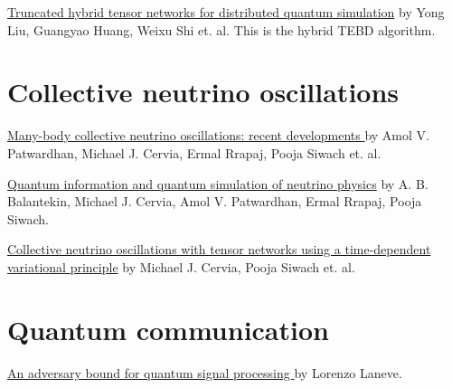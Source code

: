 \documentclass{article}
\newcommand{\vs}[1][1]{         %
    \vspace{#1em}
}
\begin{document}
\vs 

\href{https://arxiv.org/abs/2609.16520}{Truncated hybrid tensor networks for distributed quantum simulation} by Yong Liu, Guangyao Huang, Weixu Shi et. al. This is the hybrid TEBD algorithm.

\section{Collective neutrino oscillations}
\href{https://arxiv.org/abs/2301.00342}{Many-body collective neutrino oscillations: recent developments
} by Amol V. Patwardhan, Michael J. Cervia, Ermal Rrapaj, Pooja Siwach et. al.

\vs

\href{https://arxiv.org/abs/2305.01150}{Quantum information and quantum simulation of neutrino physics} by A. B. Balantekin, Michael J. Cervia, Amol V. Patwardhan, Ermal Rrapaj, Pooja Siwach.
\vs 

\href{https://arxiv.org/abs/2202.01865}{Collective neutrino oscillations with tensor networks using a time-dependent variational principle} by Michael J. Cervia, Pooja Siwach et. al.

\section{Quantum communication}

\href{https://arxiv.org/abs/2506.20484}{   An adversary bound for quantum signal processing
} by Lorenzo Laneve.
\end{document}
